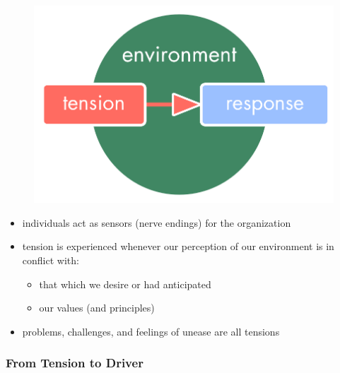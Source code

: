 \begin{figure}[htbp]
\centering
\includegraphics[keepaspectratio,width=\textwidth,height=0.75\textheight]{img/tension-driver-domain/tension-response.png}
\end{figure}

\begin{itemize}
\item individuals act as sensors (nerve endings) for the organization

\item tension is experienced whenever our perception of our environment is in conflict with:

\begin{itemize}
\item that which we desire or had anticipated

\item our values (and principles)

\end{itemize}

\item problems, challenges, and feelings of unease are all tensions

\end{itemize}

\subsubsection{From Tension to Driver}
\label{fromtensiontodriver}

